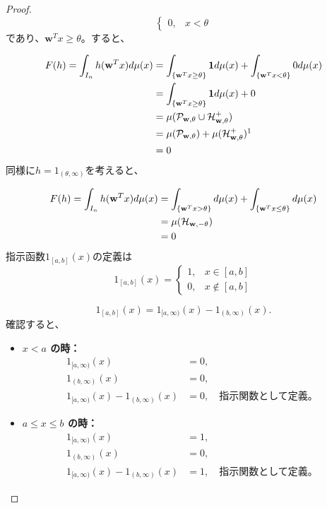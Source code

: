 \documentclass[a4paper]{jsarticle}%
\begin{document}
\begin{lem}
\begin{proof}
{\[\begin{cases}
0, & x < \theta
\end{cases}
\]}であり、$\mathbf{w}^T x\geq\theta$。すると、


\begin{align}
  F(h) = \int_{I_n} h(\mathbf{w}^T x) d\mu(x) &= \int_{\{\mathbf{w}^T x \geq \theta\}} \mathbf{1} d\mu(x)  +\int_{\{\mathbf{w}^T x < \theta\}} 0d\mu(x) \notag\\
  &= \int_{\{\mathbf{w}^T x \geq \theta\}} \mathbf{1}d\mu(x) + 0 \notag\\
  &=\mu(\mathcal{P}_{\mathbf{w},\theta}\cup\mathcal{H}_{\mathbf{w},\theta}^+) \notag\\
  &= \mu(\mathcal{P}_{\mathbf{w},\theta}) + \mu(\mathcal{H}_{\mathbf{w},\theta}^+)\footnotemark\notag\\
  &= 0\notag
\end{align}
同様に$h = 1_{(\theta,\infty)}$を考えると、

\begin{align}
  F(h) = \int_{I_n} h(\mathbf{w}^T x) d\mu(x) &= \int_{\{\mathbf{w}^T x > \theta\}} d\mu(x)+\int_{\{\mathbf{w}^T x \leq \theta\}} d\mu(x)\notag \\
  &= \mu(\mathcal{H}_{\mathbf{w},-\theta}) \notag\\
  &= 0\notag
\end{align}
指示函数$1_{[a,b]}(x)$の定義は
$$
1_{[a,b]}(x) = 
\begin{cases}
1, & x \in [a,b] \\

0, & x \notin [a,b]
\end{cases}
$$

\[
1_{[a,b]}(x) = 1_{[a,\infty)}(x) - 1_{(b,\infty)}(x).
\]
確認すると、

\begin{itemize}
    \item \textbf{ $x < a$ の時：}
    \begin{align*}
    1_{[a,\infty)}(x) &= 0, \\
    1_{(b,\infty)}(x) &= 0,\\
    1_{[a,\infty)}(x) - 1_{(b,\infty)}(x) &= 0, \quad \text{指示関数として定義。}
    \end{align*}

    \item \textbf{ $a \leq x \leq b$ の時：}
    \begin{align*}
    1_{[a,\infty)}(x) &= 1, \\
    1_{(b,\infty)}(x) &= 0,\\
    1_{[a,\infty)}(x) - 1_{(b,\infty)}(x) &= 1, \quad \text{指示関数として定義。}
    \end{align*}


\end{itemize}
\end{proof}
\end{lem}
\end{document}
